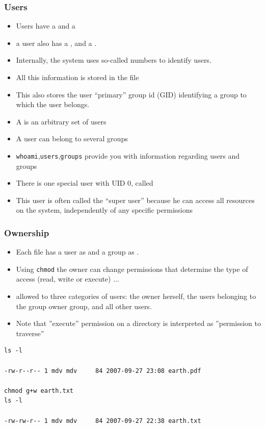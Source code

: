 \begin{frame}[fragile]\frametitle{Users}
\begin{itemize}
\item Users have a  and a 
\item a user also has a , and a .
\item Internally, the system uses so-called  numbers to identify users.
\item All this information is stored in the file 
\item This also stores the user “primary” group id (GID) identifying a group to which the user belongs.
\item A  is an arbitrary set of users
\item A user can belong to several groups
\item \lstinline!whoami!,\lstinline!users!,\lstinline!groups! provide you with information regarding users and groups
\item There is one special user with UID 0, called 
\item This user is often called the
“super user” because he can access all resources on the system, independently of
any specific permissions
\end{itemize}
\end{frame}

\begin{frame}[fragile]\frametitle{Ownership}
\begin{itemize}
\item Each file has a user as  and a group as .
\item Using \lstinline{chmod} the owner can change  permissions that determine the type of access (read,
write or execute) ...
\item allowed to three categories of users: the owner herself, the users
belonging to the group owner group, and all other users.
\item Note that ''execute'' permission on a directory is interpreted as ''permission to traverse''
\end{itemize}
\codesmall
\reslist
\begin{lstlisting}
ls -l

-rw-r--r-- 1 mdv mdv     84 2007-09-27 23:08 earth.pdf

chmod g+w earth.txt
ls -l

-rw-rw-r-- 1 mdv mdv     84 2007-09-27 22:38 earth.txt
\end{lstlisting}
\end{frame}


